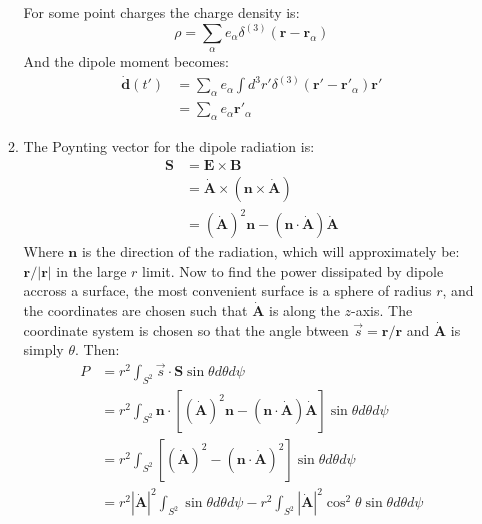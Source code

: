 \documentclass[12pt,a4]{article}
\begin{document}
\begin{enumerate}
\begin{enumerate}
        For some point charges the charge density is:
        \begin{equation*}
          \rho = \sum_\alpha e_\alpha \delta^{(3)}(\mathbf{r} - \mathbf{r}_\alpha)
        \end{equation*}
        And the dipole moment becomes:
        \begin{align*}
          \dot{\mathbf{d}}(t') &= \sum_\alpha e_\alpha \int d^3r'\delta^{(3)}(\mathbf{r}' - \mathbf{r}'_\alpha)  \mathbf{r}'\\
                               &= \sum_\alpha e_\alpha \mathbf{r}'_\alpha
        \end{align*}
      \item
        The Poynting vector for the dipole radiation is:
        \begin{align*}
          \mathbf{S} &= \mathbf{E} \times \mathbf{B}\\
                     &= \dot{\mathbf{A}} \times \left(\mathbf{n} \times \dot{\mathbf{A}}\right)\\
                     &= \left(\dot{\mathbf{A}}\right)^2\mathbf{n} - \left(\mathbf{n} \cdot \dot{\mathbf{A}}\right) \dot{\mathbf{A}}
        \end{align*}
        Where $\mathbf{n}$ is the direction of the radiation, which will approximately be: $\mathbf{r}/|\mathbf{r}|$ in the large $r$ limit.
        Now to find the power dissipated by dipole accross a surface, the most convenient surface is a sphere of radius $r$, and the coordinates are chosen such that $\dot{\mathbf{A}}$ is along the $z$-axis.
        The coordinate system is chosen so that the angle btween $\vec{s} = \mathbf{r}/\mathbf{r}$ and $\dot{\mathbf{A}}$ is simply $\theta$.
        Then:
        \begin{align*}
          P &= r^2\int_{S^2} \vec{s} \cdot \mathbf{S} \sin\theta d\theta d \psi\\
            &= r^2\int_{S^2} \mathbf{n} \cdot \left[\left(\dot{\mathbf{A}}\right)^2\mathbf{n} - \left(\mathbf{n} \cdot \dot{\mathbf{A}}\right) \dot{\mathbf{A}} \right]\sin\theta d\theta d \psi\\
            &= r^2\int_{S^2} \left[\left(\dot{\mathbf{A}}\right)^2 - \left(\mathbf{n} \cdot \dot{\mathbf{A}}\right)^2  \right]\sin\theta d\theta d \psi\\
            &= r^2\left|\dot{\mathbf{A}}\right|^2\int_{S^2} \sin\theta d\theta d \psi - r^2\int_{S^2}\left|\dot{\mathbf{A}}\right|^2\cos^2\theta \sin\theta d\theta d \psi\\

\end{align*}
\end{enumerate}
\end{enumerate}
\end{document}

